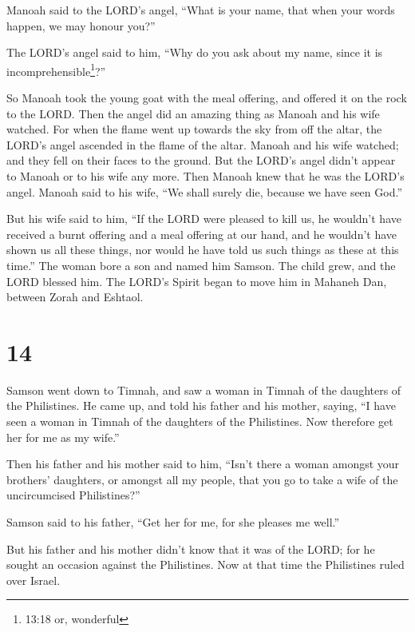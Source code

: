  Manoah said to the LORD's angel, ``What is your name, that
when your words happen, we may honour you?''

 The LORD's angel said to him, ``Why do you ask about my
name, since it is incomprehensible\footnote{13:18 or, wonderful}?''

 So Manoah took the young goat with the meal offering, and
offered it on the rock to the LORD. Then the angel did an amazing thing
as Manoah and his wife watched.  For when the flame went up
towards the sky from off the altar, the LORD's angel ascended in the
flame of the altar. Manoah and his wife watched; and they fell on their
faces to the ground.  But the LORD's angel didn't appear to
Manoah or to his wife any more. Then Manoah knew that he was the LORD's
angel.  Manoah said to his wife, ``We shall surely die,
because we have seen God.''

 But his wife said to him, ``If the LORD were pleased to
kill us, he wouldn't have received a burnt offering and a meal offering
at our hand, and he wouldn't have shown us all these things, nor would
he have told us such things as these at this time.''  The
woman bore a son and named him Samson. The child grew, and the LORD
blessed him.  The LORD's Spirit began to move him in
Mahaneh Dan, between Zorah and Eshtaol.

\hypertarget{section-13}{%
\section{14}\label{section-13}}

 Samson went down to Timnah, and saw a woman in Timnah of
the daughters of the Philistines.  He came up, and told his
father and his mother, saying, ``I have seen a woman in Timnah of the
daughters of the Philistines. Now therefore get her for me as my wife.''

 Then his father and his mother said to him, ``Isn't there a
woman amongst your brothers' daughters, or amongst all my people, that
you go to take a wife of the uncircumcised Philistines?''

Samson said to his father, ``Get her for me, for she pleases me well.''

 But his father and his mother didn't know that it was of
the LORD; for he sought an occasion against the Philistines. Now at that
time the Philistines ruled over Israel.

